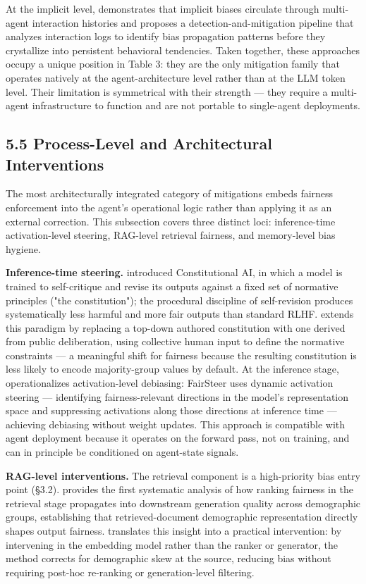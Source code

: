 \documentclass[sigconf,nonacm]{acmart}
\begin{document}
At the implicit level, \cite{borah2024implicit} demonstrates that implicit biases circulate through multi-agent interaction histories and proposes a detection-and-mitigation pipeline that analyzes interaction logs to identify bias propagation patterns before they crystallize into persistent behavioral tendencies. Taken together, these approaches occupy a unique position in Table 3: they are the only mitigation family that operates natively at the agent-architecture level rather than at the LLM token level. Their limitation is symmetrical with their strength — they require a multi-agent infrastructure to function and are not portable to single-agent deployments.

\subsection{5.5 Process-Level and Architectural Interventions}

The most architecturally integrated category of mitigations embeds fairness enforcement into the agent's operational logic rather than applying it as an external correction. This subsection covers three distinct loci: inference-time activation-level steering, RAG-level retrieval fairness, and memory-level bias hygiene.

\textbf{Inference-time steering.} \cite{bai2022constitutional} introduced Constitutional AI, in which a model is trained to self-critique and revise its outputs against a fixed set of normative principles ("the constitution"); the procedural discipline of self-revision produces systematically less harmful and more fair outputs than standard RLHF. \cite{huang2024collective} extends this paradigm by replacing a top-down authored constitution with one derived from public deliberation, using collective human input to define the normative constraints — a meaningful shift for fairness because the resulting constitution is less likely to encode majority-group values by default. At the inference stage, \cite{li2025fairsteer} operationalizes activation-level debiasing: FairSteer uses dynamic activation steering — identifying fairness-relevant directions in the model's representation space and suppressing activations along those directions at inference time — achieving debiasing without weight updates. This approach is compatible with agent deployment because it operates on the forward pass, not on training, and can in principle be conditioned on agent-state signals.

\textbf{RAG-level interventions.} The retrieval component is a high-priority bias entry point (§3.2). \cite{kim2024fair} provides the first systematic analysis of how ranking fairness in the retrieval stage propagates into downstream generation quality across demographic groups, establishing that retrieved-document demographic representation directly shapes output fairness. \cite{kim2025mitigating} translates this insight into a practical intervention: by intervening in the embedding model rather than the ranker or generator, the method corrects for demographic skew at the source, reducing bias without requiring post-hoc re-ranking or generation-level filtering.
\end{document}
